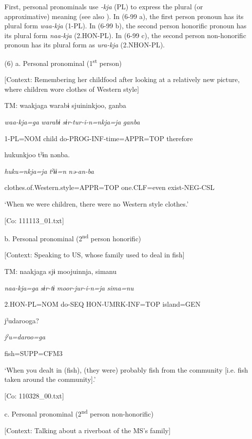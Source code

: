 First, personal pronominals use \textit{{}-kja} (PL) to express the plural (or approximative) meaning (see also ). In (6-99 a), the first person pronoun has its plural form \textit{waa-kja} (1-PL). In (6-99 b), the second person honorific pronoun has its plural form \textit{naa-kja} (2.HON-PL). In (6-99 c), the second person non-honorific pronoun has its plural form as \textit{ura-kja} (2.NHON-PL).

(6)  a.  Personal pronominal (1\textsuperscript{st} person)

    [Context: Remembering her childfood after looking at a relatively new picture, where children wore clothes of Western style]

    TM:  waakjaga  warabɨ  sjuininkjoo,  ganba

      \textit{waa-kja=ga}  \textit{warabɨ}  \textit{sɨr-tur-i-n=nkja=ja}  \textit{ganba}

      1-PL=NOM  child  do-PROG-INF-time=APPR=TOP  therefore

      hukunkjoo  tˀɨn  nənba.

      \textit{huku=nkja=ja}  \textit{tˀɨɨ=n}  \textit{nə-an-ba}

      clothes.of.Western.style=APPR=TOP  one.CLF=even  exist-NEG-CSL

      ‘When we were children, there were no Western style clothes.’

      [Co: 111113\_01.txt]

  b.  Personal pronominal (2\textsuperscript{nd} person honorific)

    [Context: Speaking to US, whose family used to deal in fish]

    TM:  naakjaga  sjɨ  moojuinnja,  simanu

      \textit{naa-kja=ga}  \textit{sɨr-tɨ}  \textit{moor-jur-i-n=ja}  \textit{sima=nu}

      2.HON-PL=NOM  do-SEQ  HON-UMRK-INF=TOP  island=GEN

      jˀudarooga?

      \textit{jˀu=daroo=ga}

      fish=SUPP=CFM3

      ‘When you dealt in (fish), (they were) probably fish from the community [i.e. fish taken around the community].’

      [Co: 110328\_00.txt]

  c.  Personal pronominal (2\textsuperscript{nd} person non-honorific)

    [Context: Talking about a riverboat of the MS’s family]

